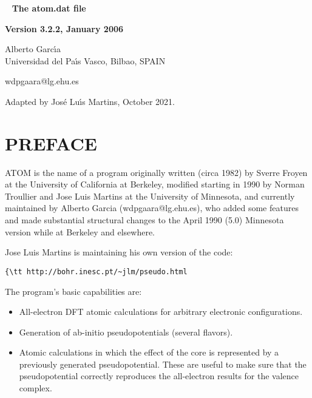\documentclass[11pt]{article}
\begin{document}

\begin{titlepage}

\begin{center}
~
\vfill
\vspace{1cm}
{\Huge {\bf The atom.dat file}}
\par\vspace{3cm}
\hrulefill
\par\vspace{3cm}
{\Large {\bf Version 3.2.2, January 2006}}
\par\vspace{2cm}
\hrulefill

{\Large Alberto Garc\'{\i}a \\
 Universidad del Pa\'{\i}s Vasco, Bilbao, SPAIN

  wdpgaara@lg.ehu.es

Adapted by Jos\'e Lu\'{\i}s Martins, October 2021.
  }
\vfill
\end{center}

\end{titlepage}

\tableofcontents
\newpage

\section{PREFACE}

{\sc ATOM} is the name of a program originally written (circa 1982) by
Sverre Froyen at the University of California at Berkeley, modified
starting in 1990 by Norman Troullier and Jose Luis Martins at the
University of Minnesota, and currently maintained by Alberto Garcia
(wdpgaara@lg.ehu.es), who added some features and made substantial
structural changes to the April 1990 (5.0) Minnesota version while at
Berkeley and elsewhere.

Jose Luis Martins is maintaining his own version of the code:
\begin{verbatim}{\tt http://bohr.inesc.pt/~jlm/pseudo.html\end{verbatim}


The program's basic capabilities are:

\begin{itemize}
\item All-electron DFT atomic calculations for arbitrary electronic
configurations.

\item Generation of ab-initio pseudopotentials (several flavors).

\item Atomic calculations in which the effect of the core is represented
by a previously generated pseudopotential. These are useful to make
sure that the pseudopotential correctly reproduces the all-electron
results for the valence complex.

\end{itemize}
\end{document}
